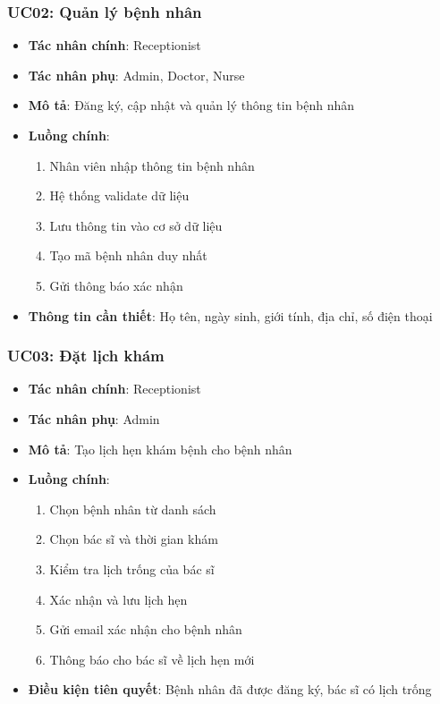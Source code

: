 \documentclass[12pt,a4paper]{report}
\begin{document}
\subsubsection{UC02: Quản lý bệnh nhân}
\begin{itemize}
    \item \textbf{Tác nhân chính}: Receptionist
    \item \textbf{Tác nhân phụ}: Admin, Doctor, Nurse
    \item \textbf{Mô tả}: Đăng ký, cập nhật và quản lý thông tin bệnh nhân
    \item \textbf{Luồng chính}:
    \begin{enumerate}
        \item Nhân viên nhập thông tin bệnh nhân
        \item Hệ thống validate dữ liệu
        \item Lưu thông tin vào cơ sở dữ liệu
        \item Tạo mã bệnh nhân duy nhất
        \item Gửi thông báo xác nhận
    \end{enumerate}
    \item \textbf{Thông tin cần thiết}: Họ tên, ngày sinh, giới tính, địa chỉ, số điện thoại
\end{itemize}

\subsubsection{UC03: Đặt lịch khám}
\begin{itemize}
    \item \textbf{Tác nhân chính}: Receptionist
    \item \textbf{Tác nhân phụ}: Admin
    \item \textbf{Mô tả}: Tạo lịch hẹn khám bệnh cho bệnh nhân
    \item \textbf{Luồng chính}:
    \begin{enumerate}
        \item Chọn bệnh nhân từ danh sách
        \item Chọn bác sĩ và thời gian khám
        \item Kiểm tra lịch trống của bác sĩ
        \item Xác nhận và lưu lịch hẹn
        \item Gửi email xác nhận cho bệnh nhân
        \item Thông báo cho bác sĩ về lịch hẹn mới
    \end{enumerate}
    \item \textbf{Điều kiện tiên quyết}: Bệnh nhân đã được đăng ký, bác sĩ có lịch trống
\end{itemize}
\end{document}
